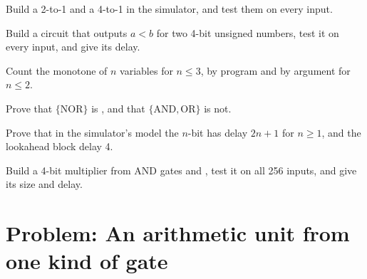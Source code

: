 \begin{exercise}[$\star\star$]\label{exo:b1:combinational-circuits:7}
Build a 2-to-1 and a 4-to-1  in the simulator, and test them on every input.
\end{exercise}

\begin{exercise}[$\star\star$]\label{exo:b1:combinational-circuits:8}
Build a circuit that outputs $a < b$ for two 4-bit unsigned numbers, test it on every input, and give its delay.
\end{exercise}

\begin{exercise}[$\star\star$]\label{exo:b1:combinational-circuits:9}
Count the monotone  of $n$ variables for $n \leq 3$, by program and by argument for $n \leq 2$.
\end{exercise}

\begin{exercise}[$\star\star\star$]\label{exo:b1:combinational-circuits:10}
Prove that $\{\text{NOR}\}$ is , and that $\{\text{AND}, \text{OR}\}$ is not.
\end{exercise}

\begin{exercise}[$\star\star\star$]\label{exo:b1:combinational-circuits:11}
Prove that in the simulator's model the $n$-bit  has delay $2n + 1$ for $n \geq 1$, and the lookahead
block delay 4.
\end{exercise}

\begin{exercise}[$\star\star\star$]\label{exo:b1:combinational-circuits:12}
Build a 4-bit  multiplier from AND gates and , test it on all 256 inputs, and give its size and delay.
\end{exercise}

\section{Problem: An arithmetic unit from one kind of gate}\label{sec:b1:combinational-circuits:problem}


